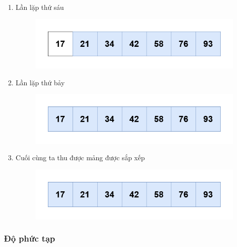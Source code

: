 \begin{enumerate}
    \item Lần lặp thứ sáu
    \begin{figure}[H]
        \centering
        \includegraphics[width=0.75\linewidth]{img/bubble_sort/27.png}
    \end{figure}

    \item Lần lặp thứ bảy
    \begin{figure}[H]
        \centering
        \includegraphics[width=0.75\linewidth]{img/bubble_sort/28.png}
    \end{figure}

    \item Cuối cùng ta thu được mảng được sắp xếp
    \begin{figure}[H]
        \centering
        \includegraphics[width=0.75\linewidth]{img/bubble_sort/28.png}
    \end{figure}
\end{enumerate}
\newpage
\subsubsection{Độ phức tạp}